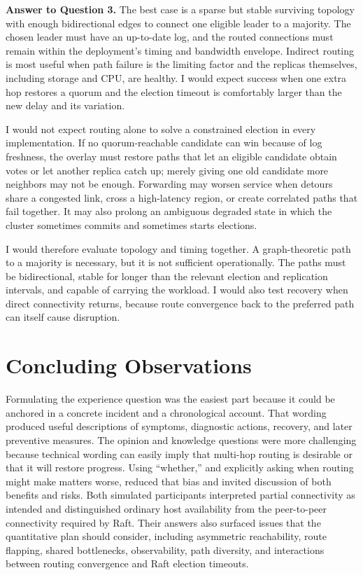 \documentclass[11pt,a4paper]{article}
\begin{document}
\textbf{Answer to Question 3.}
The best case is a sparse but stable surviving topology with enough bidirectional edges to connect one eligible leader to a majority. The chosen leader must have an up-to-date log, and the routed connections must remain within the deployment's timing and bandwidth envelope. Indirect routing is most useful when path failure is the limiting factor and the replicas themselves, including storage and CPU, are healthy. I would expect success when one extra hop restores a quorum and the election timeout is comfortably larger than the new delay and its variation.

I would not expect routing alone to solve a constrained election in every implementation. If no quorum-reachable candidate can win because of log freshness, the overlay must restore paths that let an eligible candidate obtain votes or let another replica catch up; merely giving one old candidate more neighbors may not be enough. Forwarding may worsen service when detours share a congested link, cross a high-latency region, or create correlated paths that fail together. It may also prolong an ambiguous degraded state in which the cluster sometimes commits and sometimes starts elections.

I would therefore evaluate topology and timing together. A graph-theoretic path to a majority is necessary, but it is not sufficient operationally. The paths must be bidirectional, stable for longer than the relevant election and replication intervals, and capable of carrying the workload. I would also test recovery when direct connectivity returns, because route convergence back to the preferred path can itself cause disruption.

\section{Concluding Observations}

Formulating the experience question was the easiest part because it could be anchored in a concrete incident and a chronological account. That wording produced useful descriptions of symptoms, diagnostic actions, recovery, and later preventive measures. The opinion and knowledge questions were more challenging because technical wording can easily imply that multi-hop routing is desirable or that it will restore progress. Using ``whether,'' and explicitly asking when routing might make matters worse, reduced that bias and invited discussion of both benefits and risks. Both simulated participants interpreted partial connectivity as intended and distinguished ordinary host availability from the peer-to-peer connectivity required by Raft. Their answers also surfaced issues that the quantitative plan should consider, including asymmetric reachability, route flapping, shared bottlenecks, observability, path diversity, and interactions between routing convergence and Raft election timeouts.
\end{document}

